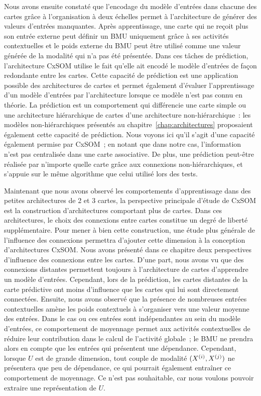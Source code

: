 \documentclass[../main]{subfiles}
\begin{document}
Nous avons ensuite constaté que l'encodage du modèle d'entrées dans chacune des cartes grâce à l'organisation à deux échelles permet à l'architecture de générer des valeurs d'entrées manquantes. Après apprentissage, une carte qui ne reçoit plus son entrée externe peut définir un BMU uniquement grâce à ses activités contextuelles et le poids externe du BMU peut être utilisé comme une valeur générée de la modalité qui n'a pas été présentée.
Dans ces tâches de prédiction, l'architecture CxSOM utilise le fait qu'elle ait encodé le modèle d'entrées de façon redondante entre les cartes. 
Cette capacité de prédiction est une application possible des architectures de cartes et permet également d'évaluer l'apprentissage d'un modèle d'entrées par l'architecture lorsque ce modèle n'est pas connu en théorie.
La prédiction est un comportement qui différencie une carte simple ou une architecture hiérarchique de cartes d'une architecture non-hiérarchique~: les modèles non-hiérarchiques présentés au chapitre~\ref{chap:architectures} proposaient également cette capacité de prédiction. Nous voyons ici qu'il s'agit d'une capacité également permise par CxSOM~; en notant que dans notre cas, l'information n'est pas centralisée dans une carte associative. De plus, une prédiction peut-être réalisée par n'importe quelle carte grâce aux connexions non-hiérarchiques, et s'appuie sur le même algorithme que celui utilisé lors des tests.

Maintenant que nous avons observé les comportements d'apprentissage dans des petites architectures de 2 et 3 cartes, la perspective principale d'étude de CxSOM est la construction d'architectures comportant plus de cartes.
Dans ces architectures, le choix des connexions entre cartes constitue un degré de liberté supplémentaire.
Pour mener à bien cette construction, une étude plus générale de l'influence des connexions permettra d'ajouter cette dimension à la conception d'architectures CxSOM.
Nous avons présenté dans ce chapitre deux perspectives d'influence des connexions entre les cartes.
D'une part, nous avons vu que des connexions distantes permettent toujours à l'architecture de cartes d'apprendre un modèle d'entrées. Cependant, lors de la prédiction, les cartes distantes de la carte prédictive ont moins d'influence que les cartes qui lui sont directement connectées.
Ensuite, nous avons observé que la présence de nombreuses entrées contextuelles amène les poids contextuels à s'organiser vers une valeur moyenne des entrées. Dans le cas ou ces entrées sont indépendantes au sein du modèle d'entrées, ce comportement de moyennage permet aux activités contextuelles de réduire leur contribution dans le calcul de l'activité globale~; le BMU ne prendra alors en compte que les entrées qui présentent une dépendance. Cependant, lorsque $U$ est de grande dimension, tout couple de modalité $(X^{({i})}, X^{({j})})$ ne présentera que peu de dépendance, ce qui pourrait également entraîner ce comportement de moyennage. Ce n'est pas souhaitable, car nous voulons pouvoir extraire une représentation de $U$. 
\end{document}
